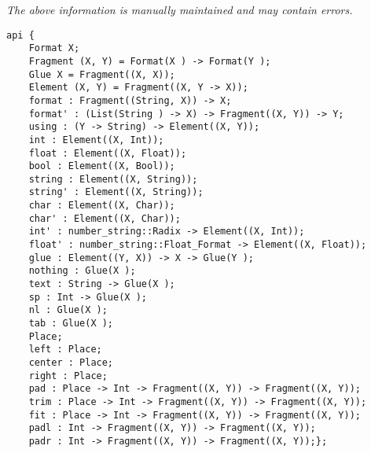 \label{api:Printf\_Combinator}

{\tiny \it The above information is manually maintained and may contain errors.}
\begin{verbatim}
api {
    Format X;
    Fragment (X, Y) = Format(X ) -> Format(Y );
    Glue X = Fragment((X, X));
    Element (X, Y) = Fragment((X, Y -> X));
    format : Fragment((String, X)) -> X;
    format' : (List(String ) -> X) -> Fragment((X, Y)) -> Y;
    using : (Y -> String) -> Element((X, Y));
    int : Element((X, Int));
    float : Element((X, Float));
    bool : Element((X, Bool));
    string : Element((X, String));
    string' : Element((X, String));
    char : Element((X, Char));
    char' : Element((X, Char));
    int' : number_string::Radix -> Element((X, Int));
    float' : number_string::Float_Format -> Element((X, Float));
    glue : Element((Y, X)) -> X -> Glue(Y );
    nothing : Glue(X );
    text : String -> Glue(X );
    sp : Int -> Glue(X );
    nl : Glue(X );
    tab : Glue(X );
    Place;
    left : Place;
    center : Place;
    right : Place;
    pad : Place -> Int -> Fragment((X, Y)) -> Fragment((X, Y));
    trim : Place -> Int -> Fragment((X, Y)) -> Fragment((X, Y));
    fit : Place -> Int -> Fragment((X, Y)) -> Fragment((X, Y));
    padl : Int -> Fragment((X, Y)) -> Fragment((X, Y));
    padr : Int -> Fragment((X, Y)) -> Fragment((X, Y));};
\end{verbatim}

